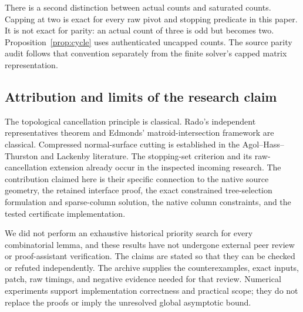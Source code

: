 There is a second distinction between actual counts and saturated counts.
Capping at two is exact for every raw pivot and stopping predicate in
this paper.  It is not exact for parity: an actual count of three is odd
but becomes two.  Proposition~\ref{prop:cycle} uses authenticated uncapped
counts.  The source parity audit follows that convention separately from
the finite solver's capped matrix representation.

\subsection{Attribution and limits of the research claim}
The topological cancellation principle is classical.  Rado's independent
representatives theorem and Edmonds' matroid-intersection framework are
classical.  Compressed normal-surface cutting is established in the
Agol--Hass--Thurston and Lackenby literature.  The stopping-set criterion
and its raw-cancellation extension already occur in the inspected incoming
research.  The contribution claimed here is their specific connection to
the native source geometry, the retained interface proof, the exact
constrained tree-selection formulation and sparse-column solution, the
native column constraints, and the tested certificate implementation.

We did not perform an exhaustive historical priority search for every
combinatorial lemma, and these results have not undergone external peer
review or proof-assistant verification.  The claims are stated so that
they can be checked or refuted independently.  The archive supplies the
counterexamples, exact inputs, patch, raw timings, and negative evidence
needed for that review.  Numerical experiments support implementation
correctness and practical scope; they do not replace the proofs or imply
the unresolved global asymptotic bound.
